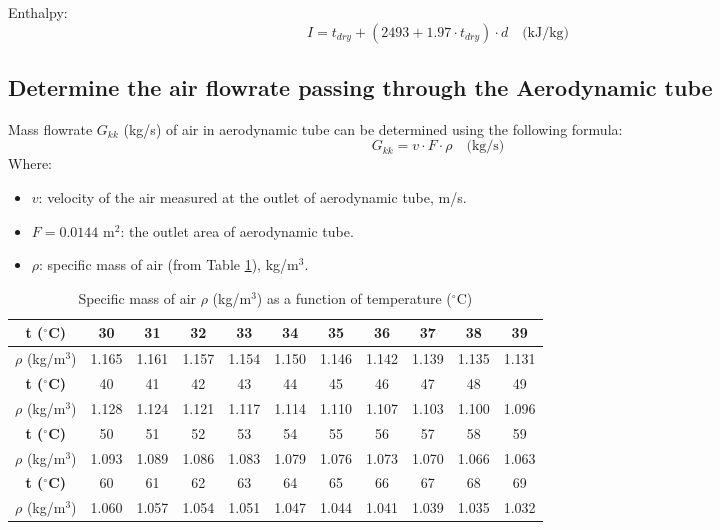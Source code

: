\noindent Enthalpy:
\begin{equation}
    I = t_{dry} + (2493 + 1.97 \cdot t_{dry}) \cdot d \quad \text{(kJ/kg)}
\end{equation}

\subsection{Determine the air flowrate passing through the Aerodynamic tube}
Mass flowrate $G_{kk}$ (kg/s) of air in aerodynamic tube can be determined using the following formula:
\begin{equation}
    G_{kk} = v \cdot F \cdot \rho \quad \text{(kg/s)}
\end{equation}
Where:
\begin{itemize}
    \item $v$: velocity of the air measured at the outlet of aerodynamic tube, m/s.
    \item $F = 0.0144$ m$^2$: the outlet area of aerodynamic tube.
    \item $\rho$: specific mass of air (from Table \ref{tab:airdensity}), kg/m$^3$.
\end{itemize}

\begin{table}[H]
\centering
\caption{Specific mass of air $\rho$ (kg/m$^3$) as a function of temperature ($^\circ$C)}
\label{tab:airdensity}
\begin{tabular}{|c|c|c|c|c|c|c|c|c|c|c|}
\hline
\textbf{t ($^\circ$C)} & 30 & 31 & 32 & 33 & 34 & 35 & 36 & 37 & 38 & 39 \\ \hline
$\rho$ (kg/m$^3$) & 1.165 & 1.161 & 1.157 & 1.154 & 1.150 & 1.146 & 1.142 & 1.139 & 1.135 & 1.131 \\ \hline
\textbf{t ($^\circ$C)} & 40 & 41 & 42 & 43 & 44 & 45 & 46 & 47 & 48 & 49 \\ \hline
$\rho$ (kg/m$^3$) & 1.128 & 1.124 & 1.121 & 1.117 & 1.114 & 1.110 & 1.107 & 1.103 & 1.100 & 1.096 \\ \hline
\textbf{t ($^\circ$C)} & 50 & 51 & 52 & 53 & 54 & 55 & 56 & 57 & 58 & 59 \\ \hline
$\rho$ (kg/m$^3$) & 1.093 & 1.089 & 1.086 & 1.083 & 1.079 & 1.076 & 1.073 & 1.070 & 1.066 & 1.063 \\ \hline
\textbf{t ($^\circ$C)} & 60 & 61 & 62 & 63 & 64 & 65 & 66 & 67 & 68 & 69 \\ \hline
$\rho$ (kg/m$^3$) & 1.060 & 1.057 & 1.054 & 1.051 & 1.047 & 1.044 & 1.041 & 1.039 & 1.035 & 1.032 \\ \hline
\end{tabular}
\end{table}

